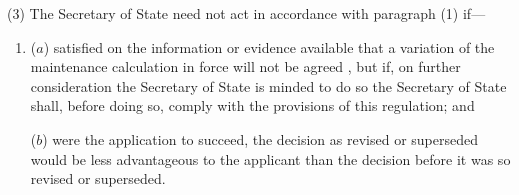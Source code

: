 \documentclass[12pt,a4paper]{article}
\begin{document}
(3) The 
Secretary of State  %
need not act in accordance with paragraph (1) if—
\begin{enumerate}\item[]
($a$) 
satisfied on the information or evidence available that a variation of the maintenance calculation in force will not be agreed%
, but if, on further consideration 
the Secretary of State  %
is minded to do so 
the Secretary of State  %
shall, before doing so, comply with the provisions of this regulation; and

($b$) were the application to succeed, the decision as revised or superseded would be less advantageous to the applicant than the decision before it was so revised or superseded.
\end{enumerate}
\end{document}
